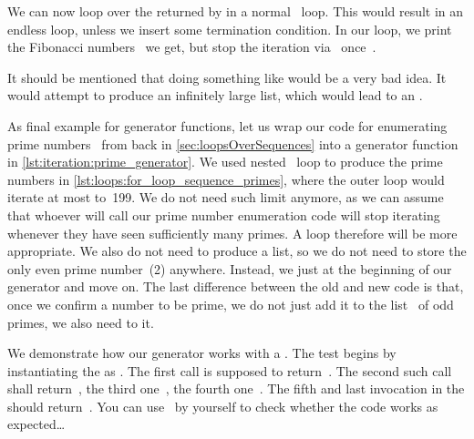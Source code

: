 We can now loop over the  returned by  in a normal ~loop.
This would result in an endless loop, unless we insert some termination condition.
In our loop, we print the Fibonacci numbers~ we get, but stop the iteration via~ once~.

It should be mentioned that doing something like  would be a very bad idea.
It would attempt to produce an infinitely large list, which would lead to an .

As final example for generator functions, let us wrap our code for enumerating prime numbers~\cite{W2024PN,CP2005PNACP,R1994PNACMFF} from back in \cref{sec:loopsOverSequences} into a generator function in \cref{lst:iteration:prime_generator}.
We used nested ~loop to produce the prime numbers in \cref{lst:loops:for_loop_sequence_primes}, where the outer loop would iterate at most to~199.
We do not need such limit anymore, as we can assume that whoever will call our prime number enumeration code will stop iterating whenever they have seen sufficiently many primes.
A  loop therefore will be more appropriate.
We also do not need to produce a list, so we do not need to store the only even prime number~(2) anywhere.
Instead, we just  at the beginning of our generator and move on.
The last difference between the old and new code is that, once we confirm a number to be prime, we do not just add it to the list~ of odd primes, we also need to  it.

We demonstrate how our generator works with a .
The test begins by instantiating the  as .
The first  call is supposed to return~.
The second such call shall return~, the third one~, the fourth one~.
The fifth and last  invocation in the  should return~.
You can use \pytest\ by yourself to check whether the code works as expected\dots%
\FloatBarrier%
\endhsection%
%
\endhsection%
%
